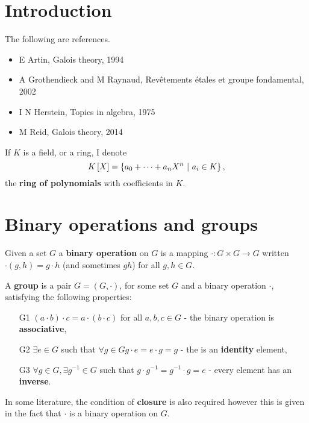





\section{Introduction}


The following are references.
\begin{itemize}
\item E Artin, Galois theory, 1994
\item A Grothendieck and M Raynaud, Rev\^etements \'etales et groupe fondamental, 2002
\item I N Herstein, Topics in algebra, 1975
\item M Reid, Galois theory, 2014
\end{itemize}

\begin{notation*}
If $ K $ is a field, or a ring, I denote
$$ K\sbr{X} = \cbr{a_0 + \dots + a_nX^n \st a_i \in K}, $$
the \textbf{ring of polynomials} with coefficients in $ K $.
\end{notation*}

\section{Binary operations and groups}

\begin{definition}
    Given a set $G$ a \textbf{binary operation} on $G$ is a mapping $\cdot: G\times G \rightarrow G$ written $\cdot(g,h) = g\cdot h$ (and sometimes $gh$) for all $g,h\in G$.
\end{definition}

\begin{definition}[Group]
    A \textbf{group} is a pair $G=(G,\cdot)$, for some set $G$ and a binary operation $\cdot$, satisfying the following properties: \begin{enumerate}
        \item[G1] $(a\cdot b)\cdot c = a \cdot (b\cdot c)$ for all $a,b,c\in G$ - the binary operation is \textbf{associative},
        \item[G2] $\exists e\in G$ such that $\forall g\in G g\cdot e = e\cdot g = g $ - the is an \textbf{identity} element,
        \item[G3] $\forall g\in G, \exists g^{-1} \in G$ such that $g\cdot g^{-1} = g^{-1}\cdot g = e$ - every element has an \textbf{inverse}.
    \end{enumerate}
    In some literature, the condition of \textbf{closure} is also required however this is given in the fact that $\cdot$ is a binary operation on $G$.
\end{definition}


